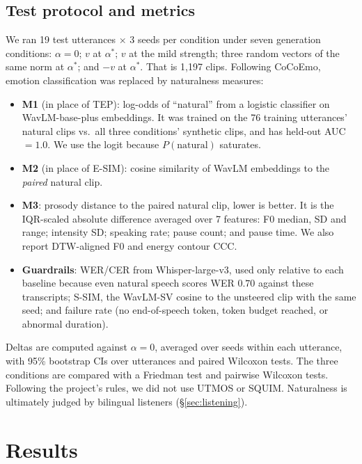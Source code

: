 \documentclass[11pt]{article}
\newcommand{\astar}{\alpha^{*}}
\begin{document}
\subsection{Test protocol and metrics}
We ran 19 test utterances $\times$ 3 seeds per condition under seven generation conditions: $\alpha=0$; $v$ at $\astar$; $v$ at the mild strength; three random vectors of the same norm at $\astar$; and $-v$ at $\astar$. That is 1{,}197 clips. Following CoCoEmo, emotion classification was replaced by naturalness measures:
\begin{itemize}
\item \textbf{M1} (in place of TEP): log-odds of ``natural'' from a logistic classifier on WavLM-base-plus embeddings. It was trained on the 76 training utterances' natural clips vs.\ all three conditions' synthetic clips, and has held-out AUC $=1.0$. We use the logit because $P(\text{natural})$ saturates.
\item \textbf{M2} (in place of E-SIM): cosine similarity of WavLM embeddings to the \emph{paired} natural clip.
\item \textbf{M3}: prosody distance to the paired natural clip, lower is better. It is the IQR-scaled absolute difference averaged over 7 features: F0 median, SD and range; intensity SD; speaking rate; pause count; and pause time. We also report DTW-aligned F0 and energy contour CCC.
\item \textbf{Guardrails}: WER/CER from Whisper-large-v3, used only relative to each baseline because even natural speech scores WER $0.70$ against these transcripts; S-SIM, the WavLM-SV cosine to the unsteered clip with the same seed; and failure rate (no end-of-speech token, token budget reached, or abnormal duration).
\end{itemize}
Deltas are computed against $\alpha=0$, averaged over seeds within each utterance, with 95\% bootstrap CIs over utterances and paired Wilcoxon tests. The three conditions are compared with a Friedman test and pairwise Wilcoxon tests. Following the project's rules, we did not use UTMOS or SQUIM. Naturalness is ultimately judged by bilingual listeners (\S\ref{sec:listening}).

\section{Results}
\end{document}
